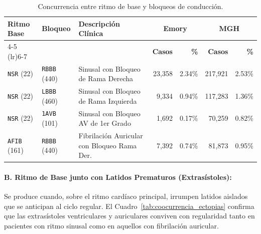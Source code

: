 \documentclass[11pt,a4paper]{article}
\begin{document}
\begin{table}[htbp]
\centering
\small
\renewcommand{\arraystretch}{1.12}
\setlength{\tabcolsep}{5pt}
\begin{tabularx}{\textwidth}{@{} ll X rr rr @{}}
\toprule
\multirow{2}{*}{\textbf{Ritmo Base}} & \multirow{2}{*}{\textbf{Bloqueo}} & \multirow{2}{*}{\textbf{Descripción Clínica}} & \multicolumn{2}{c}{\textbf{Emory}} & \multicolumn{2}{c}{\textbf{MGH}} \\
\cmidrule(lr){4-5} \cmidrule(lr){6-7}
& & & \textbf{Casos} & \textbf{\%} & \textbf{Casos} & \textbf{\%} \\
\midrule
\texttt{NSR} (22)  & \texttt{RBBB} (440) & Sinusal con Bloqueo de Rama Derecha         & 23,358 & 2.34\% & 217,921 & 2.53\% \\
\texttt{NSR} (22)  & \texttt{LBBB} (460) & Sinusal con Bloqueo de Rama Izquierda       &  9,334 & 0.94\% & 117,283 & 1.36\% \\
\texttt{NSR} (22)  & \texttt{1AVB} (101) & Sinusal con Bloqueo AV de 1er Grado         &  1,692 & 0.17\% &  70,259 & 0.82\% \\
\texttt{AFIB} (161)& \texttt{RBBB} (440) & Fibrilación Auricular con Bloqueo Rama Der. &  7,392 & 0.74\% &  81,873 & 0.95\% \\
\bottomrule
\end{tabularx}
\caption{Concurrencia entre ritmo de base y bloqueos de conducción.}
\label{tab:coocurrencia_bloqueos}
\end{table}
\newpage

\paragraph{B. Ritmo de Base junto con Latidos Prematuros (Extrasístoles):}
Se produce cuando, sobre el ritmo cardíaco principal, irrumpen latidos aislados que se anticipan al ciclo regular. El Cuadro~\ref{tab:coocurrencia_ectopias} confirma que las extrasístoles ventriculares y auriculares conviven con regularidad tanto en pacientes con ritmo sinusal como en aquellos con fibrilación auricular.
\end{document}
